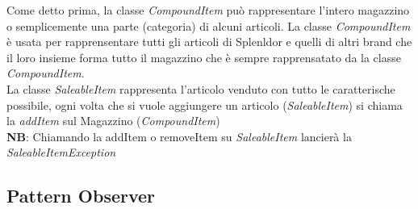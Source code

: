 \documentclass[12pt]{article}
\begin{document}
Come detto prima, la classe \textit{CompoundItem} può rappresentare l'intero magazzino o semplicemente una parte (categoria) di alcuni articoli. La classe \textit{CompoundItem} è usata per rapprensentare tutti gli articoli di Splenldor e quelli di altri brand che il loro insieme forma tutto il magazzino che è sempre rapprensatato da la classe \textit{CompoundItem}.
\\
La classe \textit{SaleableItem} rappresenta l'articolo venduto con tutto le caratterische possibile, ogni volta che si vuole aggiungere un articolo (\textit{SaleableItem}) si chiama la \textit{addItem} sul Magazzino (\textit{CompoundItem})
\\
\textbf{NB}: Chiamando la addItem o removeItem su \textit{SaleableItem} lancierà la \textit{SaleableItemException}


\subsection{Pattern Observer}
\end{document}
